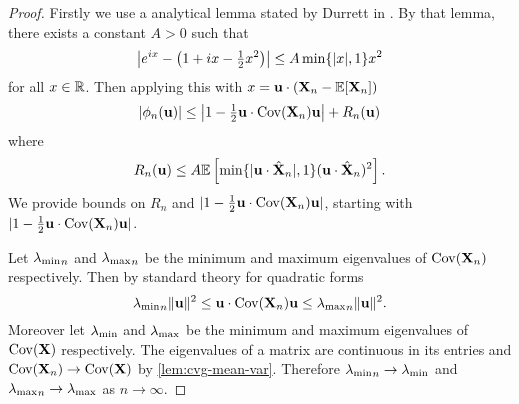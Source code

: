 \begin{proof}
    Firstly we use a analytical lemma stated by Durrett in \cite[P.116, Lemma 3.3.19]{durrettProbabilityTheoryExamples2019}. By that lemma, there exists a constant $A > 0$ such that 
    \begin{equation*}
        \abs*{e^{ix} - \left(1 + i x - \tfrac{1}{2}x^2\right)} \leq A \min\{\abs{x}, 1\} x^2
    \end{equation*}
    for all $x \in \R$. Then applying this with $x = \vu \cdot (\vX_n - \E[\vX_n])$
    \begin{equation*}
        \abs{\phi_n(\vu)}
        \leq \abs*{1 - \tfrac{1}{2} \vu \cdot \cov(\vX_n) \vu } + R_n(\vu)
    \end{equation*}
    where
    \begin{equation*}
        R_n(\vu) \leq A \E\left[ 
            \min\{\abs{\vu \cdot \hat{\vX}_n}, 1\} (\vu \cdot \hat{\vX}_n)^2
        \right].
    \end{equation*}
    We provide bounds on $R_n$ and $\abs{1 - \frac{1}{2} \vu \cdot \cov(\vX_n) \vu}$, starting with $\abs{1 - \frac{1}{2} \vu \cdot \cov(\vX_n) \vu}$.

    Let $\mineval_n$ and $\maxeval_n$ be the minimum and maximum eigenvalues of $\cov(\vX_n)$ respectively. Then by standard theory for quadratic forms
    \begin{equation*}
        \mineval_n \norm{\vu}^2
        \leq \vu \cdot \cov(\vX_n) \vu
        \leq \maxeval_n \norm{\vu}^2.
    \end{equation*}
    Moreover let $\mineval$ and $\maxeval$ be the minimum and maximum eigenvalues of $\cov(\vX)$ respectively. The eigenvalues of a matrix are continuous in its entries and $\cov(\vX_n) \to \cov(\vX)$ by \cref{lem:cvg-mean-var}. Therefore $\mineval_n \to \mineval$ and $\maxeval_n \to \maxeval$ as $n \to \infty$.


\end{proof}
